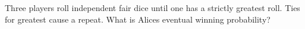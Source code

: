 Three players roll independent fair dice until one has a strictly greatest roll. Ties for greatest cause a repeat. What is Alice\textquotesingle s eventual winning probability?
